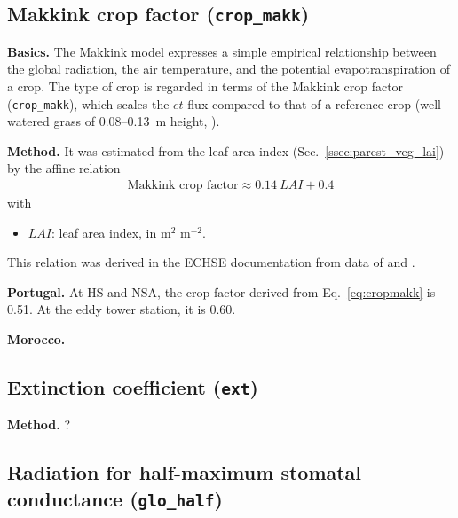 \documentclass{scrreprt}
\newenvironment{denseitem}{
  \begin{itemize}
    \setlength{\itemsep}{0pt}
    \setlength{\parskip}{0pt}
    \setlength{\parsep}{0pt}
}{
  \end{itemize}
}
\begin{document}
\newpage
\subsection{Makkink crop factor (\texttt{crop\_makk})} \label{ssec:parest_veg_cropmakk}

\textbf{Basics.}
The Makkink model expresses a simple empirical relationship between the global radiation, the air temperature, and the potential evapotranspiration of a crop.
The type of crop is regarded in terms of the Makkink crop factor (\verb!crop_makk!), which scales the $et$ flux compared to that of a reference crop (well-watered grass of 0.08--0.13~m height, \citealt{feddes87}).

\noindent
\textbf{Method.}
It was estimated from the leaf area index (Sec.~\ref{ssec:parest_veg_lai}) by the affine relation
\begin{align} \label{eq:cropmakk}
  \text{Makkink~crop~factor} \approx 0.14 ~ LAI + 0.4
\end{align}
%
with
\begin{denseitem}
  \item[] $LAI$: leaf area index, in m$^2$ m$^{-2}$.
\end{denseitem}
%
This relation was derived in the ECHSE documentation from data of \citet{feddes87} and \citet{ludwig06}.

\noindent
\textbf{Portugal.}
At HS and NSA, the crop factor derived from Eq.~\eqref{eq:cropmakk} is 0.51. At the eddy tower station, it is 0.60.

\noindent
\textbf{Morocco.}
---

\newpage
\subsection{Extinction coefficient (\texttt{ext})} \label{ssec:parest_veg_ext}

\textbf{Method.}
?

\newpage
\subsection{Radiation for half-maximum stomatal conductance (\texttt{glo\_half})} \label{ssec:parest_veg_glohalf}
\end{document}
